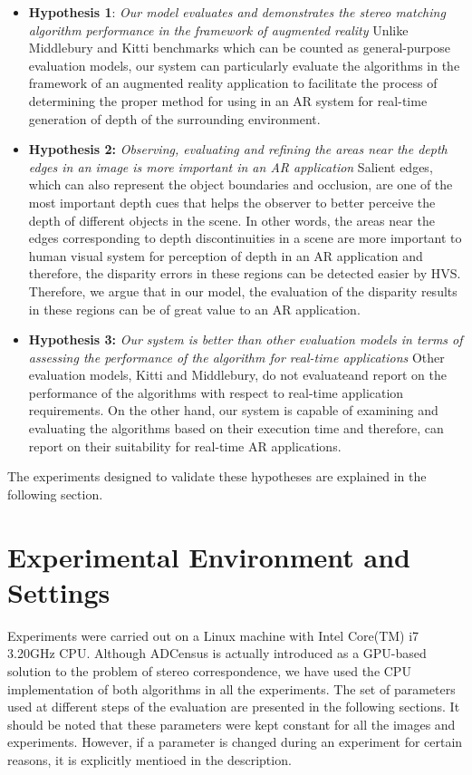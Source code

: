 \begin{itemize}
\item \textbf{Hypothesis 1}: \emph{Our model evaluates and demonstrates the stereo matching algorithm performance in the framework of augmented reality} 
Unlike Middlebury and Kitti benchmarks which can be counted as general-purpose evaluation models, our system can particularly evaluate the algorithms in the framework of an 
augmented reality application to facilitate the process of determining
the proper method for using in an AR system for real-time generation of depth of the surrounding environment.

\item \textbf{Hypothesis 2:} \emph{Observing, evaluating and refining the areas near the depth edges in an image is more important in an AR application}
Salient edges, which can also represent the object boundaries and occlusion, are one of the 
most important depth cues that helps the observer to better perceive the depth of different objects in the scene. In other words, the areas near the edges corresponding to depth discontinuities
in a scene are more important to human visual system for perception of depth in an AR application and therefore, the disparity 
errors in these regions can be detected easier by HVS. Therefore, we argue that in our model, the evaluation of the disparity results in these regions can be of great value 
to an AR application.

\item \textbf{Hypothesis 3:} \emph{Our system is better than other evaluation models in terms of assessing the performance of the algorithm for real-time applications}  
Other evaluation models, Kitti and Middlebury, do not evaluateand report on the performance of the algorithms
with respect to real-time application requirements. On the other hand, our system is capable of examining and evaluating the algorithms 
based on their execution time and therefore, can report on
their suitability for real-time AR applications.

\end{itemize}

The experiments designed to validate these hypotheses are explained in the following section.

\section{Experimental Environment and Settings}
Experiments were carried out on a Linux machine with Intel Core(TM) i7 3.20GHz CPU. 
Although ADCensus is actually introduced as a GPU-based solution to the problem of stereo correspondence, 
we have used the CPU implementation of both algorithms in all the experiments.
The set of parameters used at different steps of the evaluation are presented in the following sections.
It should be noted that these parameters were kept constant for all the images and experiments. However, if a parameter is changed during an experiment for certain
reasons, it is explicitly mentioed in the description.


